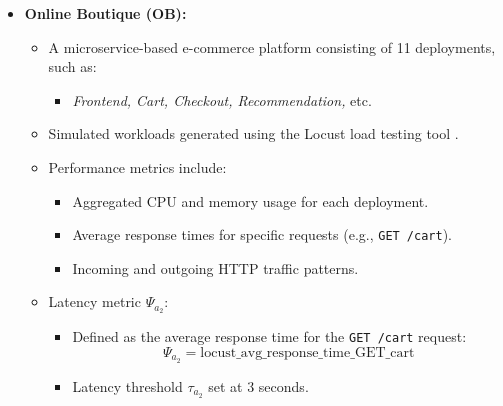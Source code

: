 \documentclass[conference]{IEEEtran}
\begin{document}
\begin{itemize}
\begin{itemize}
        \item \textbf{Online Boutique (OB):}
        \begin{itemize}
            \item A microservice-based e-commerce platform consisting of 11 deployments, such as:
            \begin{itemize}
                \item \textit{Frontend, Cart, Checkout, Recommendation,} etc.
            \end{itemize}
            \item Simulated workloads generated using the Locust load testing tool \cite{locust}.
            \item Performance metrics include:
            \begin{itemize}
                \item Aggregated CPU and memory usage for each deployment.
                \item Average response times for specific requests (e.g., \texttt{GET /cart}).
                \item Incoming and outgoing HTTP traffic patterns.
            \end{itemize}
            \item Latency metric $\Psi_{a_2}$:
            \begin{itemize}
                \item Defined as the average response time for the \texttt{GET /cart} request:
                \[
                \Psi_{a_2} = \text{locust\_avg\_response\_time\_GET\_cart}
                \]
                \item Latency threshold $\tau_{a_2}$ set at 3 seconds.
            \end{itemize}
        \end{itemize}
    \end{itemize}


\end{itemize}
\end{document}
